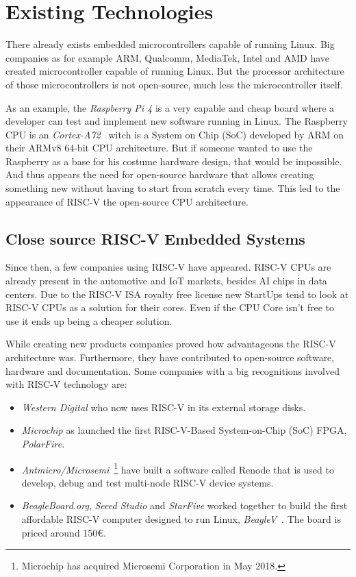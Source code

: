 \chapter{Existing Technologies}
There already exists embedded microcontrollers capable of running Linux. Big companies as for example ARM, Qualcomm, MediaTek, Intel and AMD have created microcontroller capable of running Linux. But the processor architecture of those microcontrollers is not open-source, much less the microcontroller itself. 

As an example, the \textit{Raspberry Pi 4} is a very capable and cheap board where a developer can test and implement new software running in Linux. The Raspberry CPU is an \textit{Cortex-A72}~\cite{cortex_a72} witch is a System on Chip (SoC) developed by ARM on their ARMv8 64-bit CPU architecture. But if someone wanted to use the Raspberry as a base for his costume hardware design, that would be impossible. And thus appears the need for open-source hardware that allows creating something new without having to start from scratch every time. This led to the appearance of RISC-V the open-source CPU architecture.


\section{Close source RISC-V Embedded Systems}
Since then, a few companies using RISC-V have appeared. RISC-V CPUs are already present in the automotive and IoT markets, besides AI chips in data centers. Due to the RISC-V ISA royalty free license new StartUps tend to look at RISC-V CPUs as a solution for their cores. Even if the CPU Core isn't free to use it ends up being a cheaper solution.

While creating new products companies proved how advantageous the RISC-V architecture was. Furthermore, they have contributed to open-source software, hardware and documentation. Some companies with a big recognitions involved with RISC-V technology are:
\begin{itemize}
    \item \textit{Western Digital} who now uses RISC-V in its external storage disks. 
    \item \textit{Microchip} as launched the first RISC-V-Based System-on-Chip (SoC) FPGA, \textit{PolarFire}. 
    \item \textit{Antmicro/Microsemi}~\footnote{Microchip has acquired Microsemi Corporation in May 2018.} have built a software called Renode that is used to develop, debug and test multi-node RISC-V device systems.
    \item \textit{BeagleBoard.org}, \textit{Seeed Studio} and \textit{StarFive} worked together to build the first affordable RISC-V computer designed to run Linux, \textit{BeagleV}~\cite{beagleV}. The board is priced around 150€.
\end{itemize}

